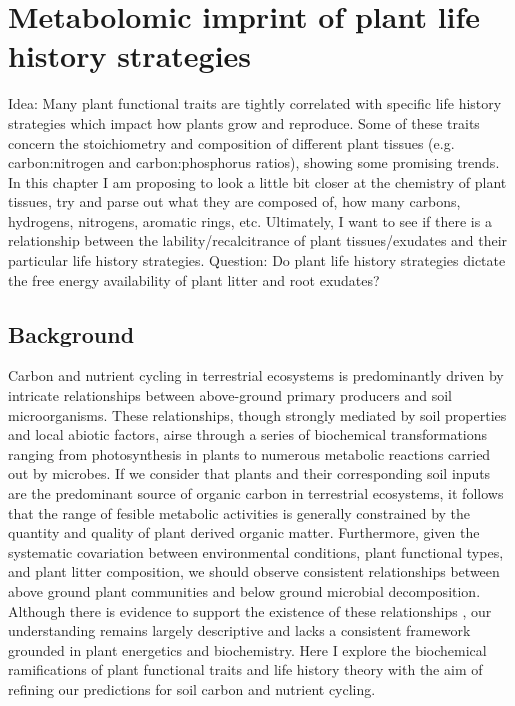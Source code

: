 \chapter{Metabolomic imprint of plant life history strategies}


Idea: Many plant functional traits are tightly correlated with specific life history strategies which impact how plants grow and reproduce. Some of these traits concern the stoichiometry and composition of different plant tissues (e.g. carbon:nitrogen and carbon:phosphorus ratios), showing some promising trends. In this chapter I am proposing to look a little bit closer at the chemistry of plant tissues, try and parse out what they are composed of, how many carbons, hydrogens, nitrogens, aromatic rings, etc. Ultimately, I want to see if there is a relationship between the lability/recalcitrance of plant tissues/exudates and their particular life history strategies.
Question: Do plant life history strategies dictate the free energy availability of plant litter and root exudates?

\section{Background}


Carbon and nutrient cycling in terrestrial ecosystems is predominantly driven by intricate relationships between above-ground primary producers and soil microorganisms. These relationships, though strongly mediated by soil properties and local abiotic factors, airse through a series of biochemical transformations ranging from photosynthesis in plants to numerous metabolic reactions carried out by microbes. If we consider that plants and their corresponding soil inputs are the predominant source of organic carbon in terrestrial ecosystems, it follows that the range of fesible metabolic activities is generally constrained by the quantity and quality of plant derived organic matter. Furthermore, given the systematic covariation between environmental conditions, plant functional types, and plant litter composition, we should observe consistent relationships between above ground plant communities and below ground microbial decomposition. Although there is evidence to support the existence of these relationships \cite{buzzard_continental_2019,hough2022a}, our understanding remains largely descriptive and lacks a consistent framework grounded in plant energetics and biochemistry. Here I explore the  biochemical ramifications of plant functional traits and life history theory with the aim of refining our predictions for soil carbon and nutrient cycling. 

